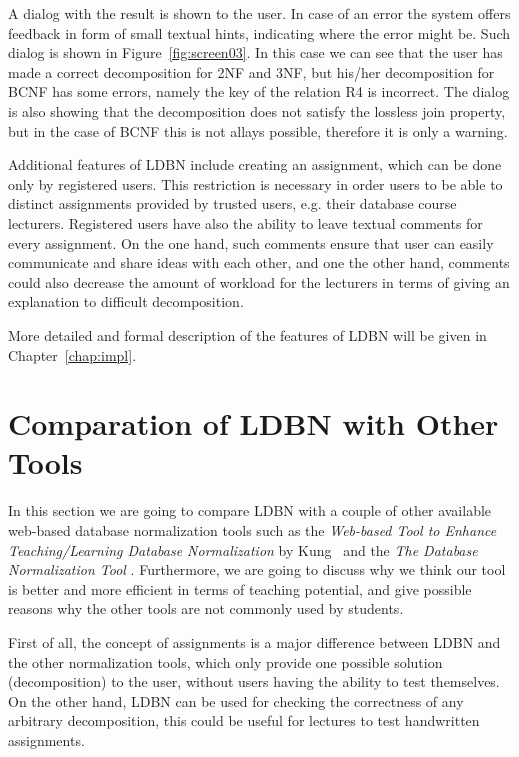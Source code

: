 A dialog with the result is shown to the user. In case of an error the system offers
feedback in form of small textual hints, indicating
where the error might be. Such dialog is shown in Figure~\ref{fig:screen03}. In this case
we can see that the user has made a correct decomposition for 2NF and 3NF,
but his/her decomposition for BCNF has some errors, namely the key of the relation R4 is
incorrect. The dialog is also showing that the decomposition does not 
satisfy the lossless join property, but in the case of BCNF this
is not allays possible, therefore it is only a warning. 

Additional features of LDBN include creating an assignment, which can be done 
only by registered users. This restriction is necessary in order users to be able 
to distinct assignments provided by trusted users, e.g. their database course
lecturers. Registered users have also the ability to leave textual comments 
for every assignment. On the one hand, such
comments ensure that user can easily communicate and share ideas
with each other, and one the other hand, comments could also decrease the amount of workload
for the lecturers in terms of giving an explanation to difficult decomposition.

More detailed and formal description of the features of LDBN will be given in
Chapter~\ref{chap:impl}. 

\section{Comparation of LDBN with Other Tools}
\label{sec:comparation}
In this section we are going to compare LDBN with a couple of other 
available web-based database normalization tools 
such as the \textit{Web-based Tool to Enhance Teaching/Learning Database 
Normalization} by Kung~\cite{p8} and the \textit{The Database Normalization Tool}
\cite{w1}. Furthermore, we are going to discuss why we think our tool is better 
and more efficient
in terms of teaching potential, and give possible reasons why the 
other tools are not commonly used by students.

First of all, the concept of assignments is a major
difference between LDBN and the other normalization tools, 
which only provide 
one possible solution (decomposition) to the user, without users having the ability to test 
themselves. On the other hand, LDBN can be used for checking the correctness of any
arbitrary decomposition, this could be useful for lectures to test handwritten assignments. 

